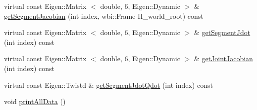 \begin{DoxyCompactItemize}
virtual const \-Eigen\-::\-Matrix\*
$<$ double, 6, \-Eigen\-::\-Dynamic $>$ \& \hyperlink{classocra__icub_1_1OcraWbiModel_a5c556d66e590314fa6c44ceb8658d540}{get\-Segment\-Jacobian} (int index, wbi\-::\-Frame \-H\-\_\-world\-\_\-root) const 
\item 
virtual const \-Eigen\-::\-Matrix\*
$<$ double, 6, \-Eigen\-::\-Dynamic $>$ \& \hyperlink{classocra__icub_1_1OcraWbiModel_a0c391aaf9a10840346b35952e89e32fc}{get\-Segment\-Jdot} (int index) const 
\item 
virtual const \-Eigen\-::\-Matrix\*
$<$ double, 6, \-Eigen\-::\-Dynamic $>$ \& \hyperlink{classocra__icub_1_1OcraWbiModel_a4dd0a4cd9f8d710c64e67c0336169321}{get\-Joint\-Jacobian} (int index) const 
\item 
virtual const \-Eigen\-::\-Twistd \& \hyperlink{classocra__icub_1_1OcraWbiModel_a3261757fab0ab980f8b92748bf5d350e}{get\-Segment\-Jdot\-Qdot} (int index) const 
\item 
void \hyperlink{classocra__icub_1_1OcraWbiModel_a309b3554c4eefda46c05b766476f40fb}{print\-All\-Data} ()
\end{DoxyCompactItemize}
